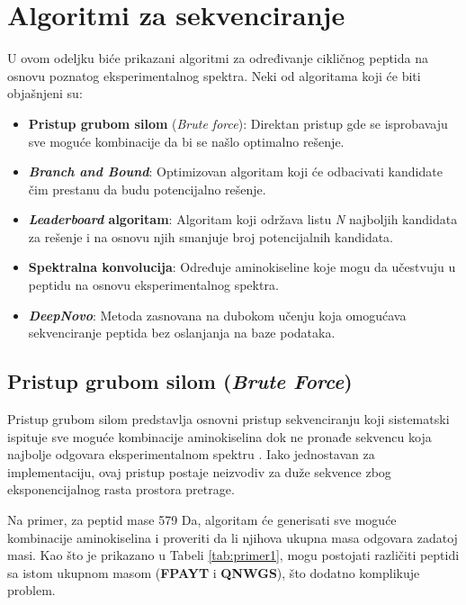 \documentclass[12pt,oneside]{memoir}
\begin{document}
\chapter{Algoritmi za sekvenciranje}
U ovom odeljku biće prikazani algoritmi za određivanje cikličnog peptida na osnovu poznatog eksperimentalnog spektra. Neki od algoritama koji će biti objašnjeni su:
\begin{itemize}
    \item \textbf{Pristup grubom silom} (\emph{Brute force}): Direktan pristup gde se isprobavaju sve moguće kombinacije da bi se našlo optimalno rešenje.
    \item \textbf{\emph{Branch and Bound}}: Optimizovan algoritam koji će odbacivati kandidate čim prestanu da budu potencijalno rešenje.
    \item \textbf{\emph{Leaderboard} algoritam}: Algoritam koji održava listu \emph{N} najboljih kandidata za rešenje i na osnovu njih smanjuje broj potencijalnih kandidata.
    \item \textbf{Spektralna konvolucija}: Određuje aminokiseline koje mogu da učestvuju u peptidu na osnovu eksperimentalnog spektra.
    \item \textbf{\emph{DeepNovo}}: Metoda zasnovana na dubokom učenju koja omogućava sekvenciranje peptida bez oslanjanja na baze podataka.
\end{itemize}

\section{Pristup grubom silom (\emph{Brute Force})}
Pristup grubom silom predstavlja osnovni pristup sekvenciranju koji sistematski ispituje sve moguće kombinacije aminokiselina dok ne pronađe sekvencu koja najbolje odgovara eksperimentalnom spektru \cite{online_lecture, online_book}. Iako jednostavan za implementaciju, ovaj pristup postaje neizvodiv za duže sekvence zbog eksponencijalnog rasta prostora pretrage.

Na primer, za peptid mase 579 Da, algoritam će generisati sve moguće kombinacije aminokiselina i proveriti da li njihova ukupna masa odgovara zadatoj masi. Kao što je prikazano u Tabeli \ref{tab:primer1}, mogu postojati različiti peptidi sa istom ukupnom masom (\textbf{FPAYT} i \textbf{QNWGS}), što dodatno komplikuje problem.
\end{document}
